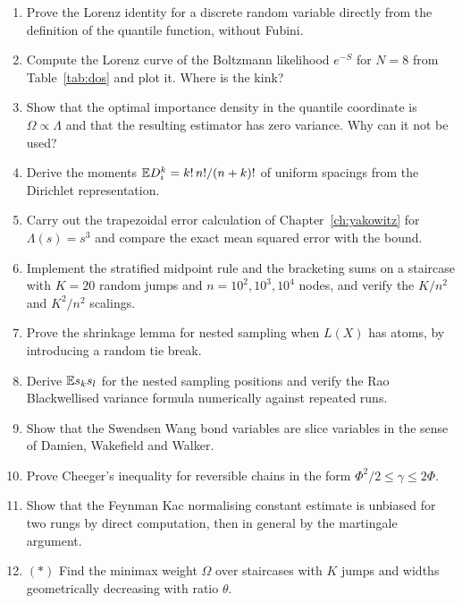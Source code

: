 \begin{enumerate}
\item Prove the Lorenz identity for a discrete random variable directly from the definition of the quantile function, without Fubini.

\item Compute the Lorenz curve of the Boltzmann likelihood $e^{-S}$ for $N = 8$ from Table~\ref{tab:dos} and plot it. Where is the kink?

\item Show that the optimal importance density in the quantile coordinate is $\Omega \propto \Lambda$ and that the resulting estimator has zero variance. Why can it not be used?

\item Derive the moments $\mathbb{E} D_i^k = k! \, n! / (n+k)!$ of uniform spacings from the Dirichlet representation.

\item Carry out the trapezoidal error calculation of Chapter~\ref{ch:yakowitz} for $\Lambda(s) = s^3$ and compare the exact mean squared error with the bound.

\item Implement the stratified midpoint rule and the bracketing sums on a staircase with $K = 20$ random jumps and $n = 10^2, 10^3, 10^4$ nodes, and verify the $K/n^2$ and $K^2/n^2$ scalings.

\item Prove the shrinkage lemma for nested sampling when $L(X)$ has atoms, by introducing a random tie break.

\item Derive $\mathbb{E} s_k s_l$ for the nested sampling positions and verify the Rao Blackwellised variance formula numerically against repeated runs.

\item Show that the Swendsen Wang bond variables are slice variables in the sense of Damien, Wakefield and Walker.

\item Prove Cheeger's inequality for reversible chains in the form $\Phi^2/2 \le \gamma \le 2\Phi$.

\item Show that the Feynman Kac normalising constant estimate is unbiased for two rungs by direct computation, then in general by the martingale argument.

\item $(*)$ Find the minimax weight $\Omega$ over staircases with $K$ jumps and widths geometrically decreasing with ratio $\theta$.
\end{enumerate}

